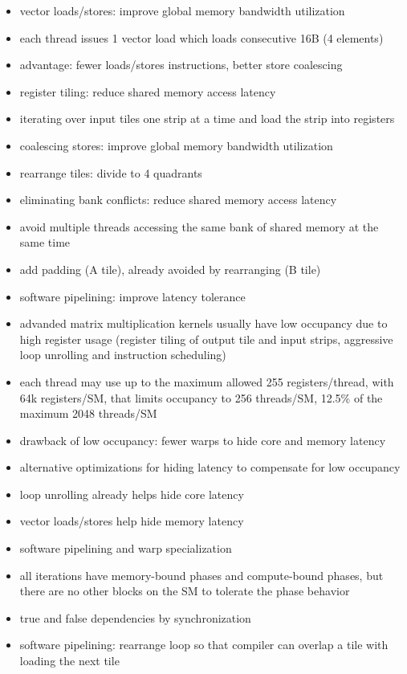 \documentclass{article}
\begin{document}
\begin{itemize}
\item vector loads/stores: improve global memory bandwidth utilization
\item each thread issues 1 vector load which loads consecutive 16B (4 elements)
\item advantage: fewer loads/stores instructions, better store coalescing
\item register tiling: reduce shared memory access latency
\item iterating over input tiles one strip at a time and load the strip into registers
\item coalescing stores: improve global memory bandwidth utilization
\item rearrange tiles: divide to 4 quadrants
\item eliminating bank conflicts: reduce shared memory access latency
\item avoid multiple threads accessing the same bank of shared memory at the same time
\item add padding (A tile), already avoided by rearranging (B tile)
\item software pipelining: improve latency tolerance
\item advanded matrix multiplication kernels usually have low occupancy due to high register usage (register tiling of output tile and input strips, aggressive loop unrolling and instruction scheduling)
\item each thread may use up to the maximum allowed 255 registers/thread, with 64k registers/SM, that limits occupancy to 256 threads/SM, 12.5\% of the maximum 2048 threads/SM
\item drawback of low occupancy: fewer warps to hide core and memory latency
\item alternative optimizations for hiding latency to compensate for low occupancy
\item loop unrolling already helps hide core latency
\item vector loads/stores help hide memory latency
\item software pipelining and warp specialization
\item all iterations have memory-bound phases and compute-bound phases, but there are no other blocks on the SM to tolerate the phase behavior
\item true and false dependencies by synchronization
\item software pipelining: rearrange loop so that compiler can overlap a tile with loading the next tile

\end{itemize}
\end{document}

